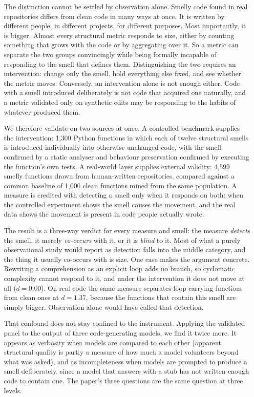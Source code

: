\documentclass[10pt,a4paper,twocolumn]{article}
\begin{document}
The distinction cannot be settled by observation alone. Smelly code found in
real repositories differs from clean code in many ways at once. It is written by
different people, in different projects, for different purposes. Most
importantly, it is bigger. Almost every structural metric responds to size,
either by counting something that grows with the code or by aggregating over it.
So a metric can separate the two groups convincingly while being formally
incapable of responding to the smell that defines them. Distinguishing the two
requires an intervention: change only the smell, hold everything else fixed, and
see whether the metric moves. Conversely, an intervention alone is not enough
either. Code with a smell introduced deliberately is not code that acquired one
naturally, and a metric validated only on synthetic edits may be responding to
the habits of whatever produced them.

We therefore validate on two sources at once. A controlled benchmark supplies
the intervention: 1{,}300 Python functions in which each of twelve structural
smells is introduced individually into otherwise unchanged code, with the smell
confirmed by a static analyser and behaviour preservation confirmed by executing
the function's own tests. A real-world layer supplies external validity: 4{,}599
smelly functions drawn from human-written repositories, compared against a
common baseline of 1{,}000 clean functions mined from the same population. A
measure is credited with detecting a smell only when it responds on both: when
the controlled experiment shows the smell causes the movement, and the real data
shows the movement is present in code people actually wrote.

The result is a three-way verdict for every measure and smell: the measure
\emph{detects} the smell, it merely \emph{co-occurs} with it, or it is
\emph{blind} to it. Most of what a purely observational study would report as
detection falls into the middle category, and the thing it usually co-occurs with
is size. One case makes the argument concrete. Rewriting a comprehension as an
explicit loop adds no branch, so cyclomatic complexity cannot respond to it, and
under the intervention it does not move at all ($d = 0.00$). On real code the same
measure separates loop-carrying functions from clean ones at $d = 1.37$, because
the functions that contain this smell are simply bigger. Observation alone would
have called that detection.

That confound does not stay confined to the instrument. Applying the validated
panel to the output of three code-generating models, we find it twice more. It
appears as verbosity when models are compared to each other (apparent structural
quality is partly a measure of how much a model volunteers beyond what was
asked), and as incompleteness when models are prompted to produce a smell
deliberately, since a model that answers with a stub has not written enough code
to contain one. The paper's three questions are the same question at three
levels.
\end{document}
